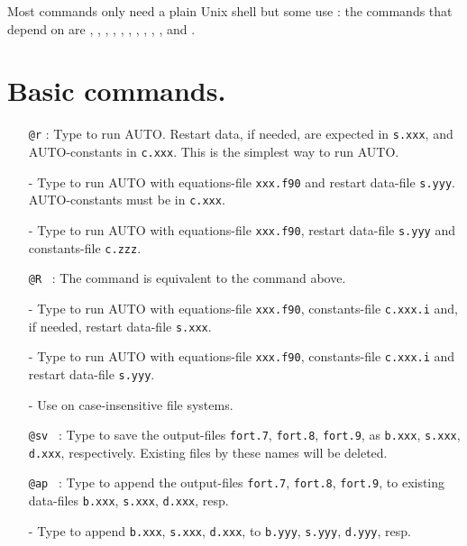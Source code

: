 \documentclass[12pt]{report}
\begin{document}
Most commands only need a plain Unix shell but some use \python: the
commands that depend on \python are ,
, , , ,
, , , ,
, and .

\section{ Basic commands.} 

\begin{itemize}
\item[\tt @r]:
  Type  to run {\cal AUTO}.
  Restart data, if needed, are expected in {\tt s.xxx},
  and {\cal AUTO}-constants in {\tt c.xxx}.
  This is the simplest way to run {\cal AUTO}.
\item[-]
  Type  to run {\cal AUTO}
  with equations-file {\tt xxx.f90} and restart data-file {\tt s.yyy}.
  {\cal AUTO}-constants must be in {\tt c.xxx}.
\item[-]
  Type  to run {\cal AUTO}
  with equations-file {\tt xxx.f90}, restart data-file {\tt s.yyy}
  and constants-file {\tt c.zzz}.

\item[\tt @R]~:
  The command  is equivalent to the command  above.
\item[-]
  Type   to run {\cal AUTO} with equations-file {\tt xxx.f90},
  constants-file {\tt c.xxx.i}
  and, if needed, restart data-file {\tt s.xxx}. 
\item[-]
  Type  to run {\cal AUTO}
  with equations-file {\tt xxx.f90}, 
  constants-file {\tt c.xxx.i}
  and restart data-file {\tt s.yyy}.
\item[-]
  Use  on case-insensitive file systems.

\item[\tt @sv]~:
  Type  to save the output-files 
  {\tt fort.7}, {\tt fort.8}, {\tt fort.9},
  as {\tt b.xxx}, {\tt s.xxx}, {\tt d.xxx}, respectively.
  Existing files by these names will be deleted.

\item[\tt @ap]~:
  Type  to append the output-files 
  {\tt fort.7}, {\tt fort.8}, {\tt fort.9}, 
  to existing data-files 
  {\tt b.xxx}, {\tt s.xxx}, {\tt d.xxx}, resp.
\item[-]
  Type  
  to append 
  {\tt b.xxx}, {\tt s.xxx}, {\tt d.xxx}, to
  {\tt b.yyy}, {\tt s.yyy}, {\tt d.yyy}, resp.


\end{itemize}
\end{document}
